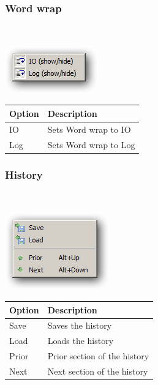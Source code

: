 \hypertarget{menu_r_rterm_wordwrap}{}
\subsubsection{Word wrap}\\

\includegraphics[scale=0.50]{./res/menu_r_rterm_wordwrap.png}\\

\begin{scriptsize}\begin{tabularx}{\textwidth}{>{\hsize=0.3\hsize}X>{\hsize=0.7\hsize}X}\\
    \hline
    \textbf{Option} & \textbf{Description} \\
    \hline
    IO & Sets Word wrap to IO \\
    Log & Sets Word wrap to Log \\
    \hline
  \end{tabularx}\end{scriptsize}


\newpage
\hypertarget{menu_r_rterm_history}{}
\subsubsection{History}\\

\includegraphics[scale=0.50]{./res/menu_r_rterm_history.png}\\

\begin{scriptsize}\begin{tabularx}{\textwidth}{>{\hsize=0.3\hsize}X>{\hsize=0.7\hsize}X}\\
    \hline
    \textbf{Option} & \textbf{Description} \\
    \hline
    Save & Saves the history \\
    Load & Loads the history \\
    Prior & Prior section of the history \\
    Next & Next section of the history \\
    \hline
  \end{tabularx}\end{scriptsize}


